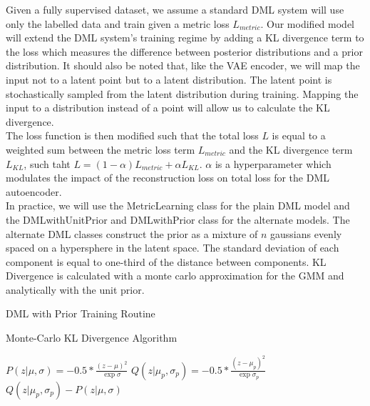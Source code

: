\documentclass[./dissertation.tex]{subfiles}
\begin{document}
    Given a fully supervised dataset, we assume a standard DML system will use only the labelled data and train given a metric loss $L_{metric}$. Our modified model will extend the DML system's training regime by adding a KL divergence term to the loss which measures the difference between posterior distributions and a prior distribution. It should also be noted that, like the VAE encoder, we will map the input not to a latent point but to a latent distribution. The latent point is stochastically sampled from the latent distribution during training. Mapping the input to a distribution instead of a point will allow us to calculate the KL divergence. \\
    
    The loss function is then modified such that the total loss $L$ is equal to a weighted sum between the metric loss term $L_{metric}$ and the KL divergence term $L_{KL}$, such taht $L = (1 - \alpha) L_{metric} + \alpha L_{KL}$. $\alpha$ is a hyperparameter which modulates the impact of the reconstruction loss on total loss for the DML autoencoder. \\
    
    In practice, we will use the MetricLearning class for the plain DML model and the DMLwithUnitPrior and DMLwithPrior class for the alternate models. The alternate DML classes construct the prior as a mixture of $n$ gaussians evenly spaced on a hypersphere in the latent space. The standard deviation of each component is equal to one-third of the distance between components. KL Divergence is calculated with a monte carlo approximation for the GMM and analytically with the unit prior.
    
    \begin{algorithm}
    \caption{DML with Prior Training Routine}\label{alg:two}
    \end{algorithm}
    \begin{algorithm}
    \caption{Monte-Carlo KL Divergence Algorithm}\label{alg:two}
    $P(z|\mu, \sigma) = -0.5 * \frac{(z - \mu)^{2}}{\exp{\sigma}}$\;
    $Q(z|\mu_{p}, \sigma_{p}) = -0.5 * \frac{(z - \mu_{p})^{2}}{\exp{\sigma_{p}}}$\;
    \Return $Q(z|\mu_{p}, \sigma_{p}) - P(z|\mu, \sigma)$
    \end{algorithm}
    
\end{document}
